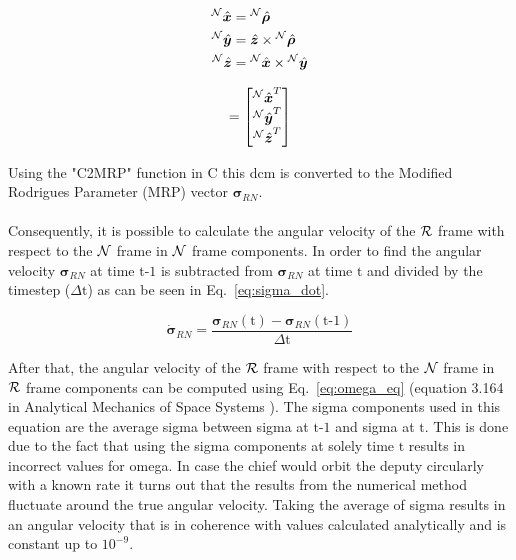 \documentclass[]{AVSreport}
\begin{document}
\begin{equation}
    \begin{split}
    {^{\cal N}\hat{{\bm x}}} &= {^{\cal N}\hat{{\bm \rho}}} \\
    {^{\cal N}\hat{{\bm y}}} &= {\hat{\bm z}} \times {^{\cal N}\hat{{\bm \rho}}} \\
    {^{\cal N}\hat{{\bm z}}} &= {^{\cal N}\hat{{\bm x}}} \times {^{\cal N}\hat{{\bm y}}}
    \end{split}
    \label{eq:R-coordinates}
\end{equation}

\begin{equation}
    [RN] = \begin{bmatrix}
            {^{\cal N}\hat{{\bm x}}}^{T}\\ 
            {^{\cal N}\hat{{\bm y}}}^{T}\\ 
            {^{\cal N}\hat{{\bm z}}}^{T}
            \end{bmatrix}
            \label{eq:dcm_RN}
\end{equation}

Using the "C2MRP" function in C this dcm is converted to the Modified Rodrigues Parameter (MRP) vector ${\bm \sigma}_{RN}$.\\
\\
Consequently, it is possible to calculate the angular velocity of the $\cal R$ frame with respect to the $\cal N$ frame in $\cal N$ frame components. In order to find the angular velocity ${\bm \sigma}_{RN}$ at time $\textrm{t-1}$ is subtracted from ${\bm \sigma}_{RN}$ at time $\textrm{t}$  and divided by the timestep ($\Delta \textrm{t}$) as can be seen in Eq.~\eqref{eq:sigma_dot}.

\begin{equation}
    \dot{\bm \sigma}_{RN} = \frac{{\bm \sigma}_{RN}(\textrm{t}) - {\bm \sigma}_{RN}(\textrm{t-1})}{\Delta \textrm{t}}
    \label{eq:sigma_dot}
\end{equation}

After that, the angular velocity of the $\cal R$ frame with respect to the $\cal N$ frame in $\cal R$ frame components can be computed using Eq.~\eqref{eq:omega_eq} (equation 3.164 in Analytical Mechanics of Space Systems \cite{Schaub}). The sigma components used in this equation are the average sigma between sigma at $\textrm{t-1}$ and sigma at $\textrm{t}$. This is done due to the fact that using the sigma components at solely time $\textrm{t}$ results in incorrect values for omega. In case the chief would orbit the deputy circularly with a known rate it turns out that the results from the numerical method fluctuate around the true angular velocity. Taking the average of sigma results in an angular velocity that is in coherence with values calculated analytically and is constant up to $10^{-9}$.
\end{document}
